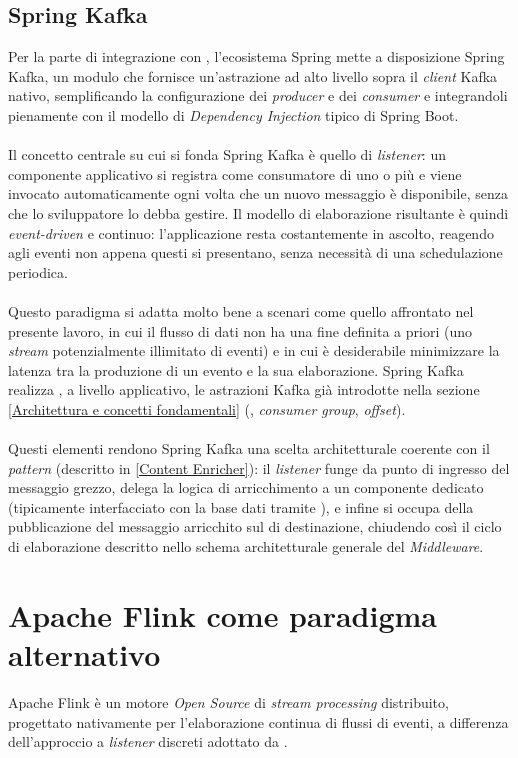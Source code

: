 \subsection{Spring Kafka}
\label{Spring Kafka}
Per la parte di integrazione con , l'ecosistema Spring mette a disposizione Spring Kafka, un modulo che fornisce un'astrazione ad alto livello sopra il \textit{client} Kafka nativo, semplificando la configurazione dei \textit{producer} e dei \textit{consumer} e integrandoli pienamente con il modello di \textit{\gls{Dependency Injection}} tipico di Spring Boot. \\ \\
Il concetto centrale su cui si fonda Spring Kafka è quello di \textit{listener}: un componente applicativo si registra come consumatore di uno o più \textit{} e viene invocato automaticamente ogni volta che un nuovo messaggio è disponibile, senza che lo sviluppatore lo debba gestire. Il modello di elaborazione risultante è quindi \textit{event-driven} e continuo: l'applicazione resta costantemente in ascolto, reagendo agli eventi non appena questi si presentano, senza necessità di una schedulazione periodica. \\ \\
Questo paradigma si adatta molto bene a scenari come quello affrontato nel presente lavoro, in cui il flusso di dati non ha una fine definita a priori (uno \textit{stream} potenzialmente illimitato di eventi) e in cui è desiderabile minimizzare la latenza tra la produzione di un evento e la sua elaborazione. Spring Kafka realizza , a livello applicativo, le astrazioni Kafka già introdotte nella sezione \ref{Architettura e concetti fondamentali} (\textit{}, \textit{consumer group}, \textit{offset}). \\ \\
Questi elementi rendono Spring Kafka una scelta architetturale coerente con il \textit{pattern}  (descritto in \ref{Content Enricher}): il \textit{listener} funge da punto di ingresso del messaggio grezzo, delega la logica di arricchimento a un componente dedicato (tipicamente interfacciato con la base dati tramite ), e infine si occupa della pubblicazione del messaggio arricchito sul \textit{} di destinazione, chiudendo così il ciclo di elaborazione descritto nello schema architetturale generale del \textit{Middleware}.

\section{Apache Flink come paradigma alternativo}
\label{Apache Flink come paradigma alternativo}
Apache Flink è un motore \textit{\gls{Open Source}} di \textit{stream processing} distribuito, progettato nativamente per l'elaborazione continua di flussi di eventi, a differenza dell'approccio a \textit{listener} discreti adottato da .

